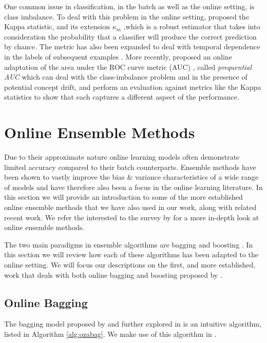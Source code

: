 One common issue in classification, in the batch as well as the online setting, is class
imbalance. To deal with this problem in the online setting, \citet{kappa-statistic}
proposed the Kappa statistic, and its extension $\kappa_m$ \cite{kappa-m},which is a robust estimator that takes into consideration
the probability that a classifier will produce the correct prediction by chance.
The metric has also been expanded to deal with temporal dependence
in the labels of subsequent examples \cite{temporal-dependence}.
More recently, \citet{prequential-auc} proposed an online adaptation
of the area under the ROC curve metric (AUC) \cite{auc}, called
\emph{prequential AUC} which can deal with the class-imbalance
problem and in the presence of potential concept drift, and perform
an evaluation against metrics like the Kappa statistics to show
that each captures a different aspect of the performance.

\section{Online Ensemble Methods}
\label{sec:bg-ol-ensembles}

Due to their approximate nature online learning models often demonstrate
limited accuracy compared to their batch counterparts. Ensemble methods
have been shown to vastly improve the bias \& variance characteristics
of a wide range of models \cite{ensemble-methods-dietrich} and have therefore
also been a focus in the online learning literature.
In this section we will provide an introduction to some of the more established
online ensemble methods that we have also used in our work, along with related
recent work. We refer the interested to the survey by \citet{online-ensembles-survey}
for a more in-depth look at online ensemble methods.

The two main paradigms in ensemble algorithms are bagging \cite{bagging} and boosting \cite{boosting-freund, boosting-schapire}. In this section we will review how each of these algorithms
has been adapted to the online setting. We will focus our descriptions on the first, and more established,
work that deals with both online bagging and boosting proposed by \citet{Oza2001online}.

\subsection{Online Bagging}

The bagging model proposed by \citet{Oza2001online} and further explored in
\cite{online-bagging-experiments} is an intuitive algorithm, listed in Algorithm
\ref{alg:ozabag}. We make use of this algorithm in \uncertaintrees.

